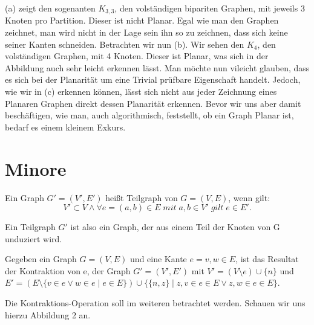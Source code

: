 \documentclass[runningheads]{llncs}
\begin{document}
(a) zeigt den sogenanten $K_{3,3}$, den
volständigen bipariten Graphen, mit jeweils 3 Knoten pro Partition. Dieser ist nicht Planar. Egal wie man den Graphen
zeichnet, man wird nicht in der Lage sein ihn so zu zeichnen, dass sich keine seiner Kanten schneiden. Betrachten wir
nun (b). Wir sehen den $K_4$, den volständigen Graphen, mit 4 Knoten. Dieser ist Planar, was sich in der Abbildung auch
sehr leicht erkennen lässt. Man möchte nun vileicht glauben, dass es sich bei der Planarität um eine Trivial prüfbare
Eigenschaft handelt. Jedoch, wie wir in (c) erkennen können, lässt sich nicht aus jeder Zeichnung eines Planaren Graphen
direkt dessen Planarität erkennen. Bevor wir uns aber damit beschäftigen, wie man, auch algorithmisch, feststellt, ob ein
Graph Planar ist, bedarf es einem kleinem Exkurs. 


\section{Minore}
\begin{definition}[Teilgraph]
    Ein Graph $G' = (V', E') $ heißt Teilgraph von $G = (V, E)$, wenn gilt:
    \[V' \subset V \land \forall e =(a, b) \in E \;mit\;  a,b \in V' \; gilt \; e \in E'.\]
\end{definition}
Ein Teilgraph $G'$ ist also ein Graph, der aus einem Teil der Knoten von G unduziert wird. 
\begin{definition}[Kantenkontraktion]
    Gegeben ein Graph $G = (V,E)$ und eine Kante $ e = {v, w} \in E $, ist das Resultat der Kontraktion von e, der Graph $G' = (V', E')$ mit
    $V' = (V \setminus e) \cup \{n \}$ und $E' = (E \setminus \{v \in e \lor w \in e  \mid e \in E \}) \cup \{ \{n, z\} \mid z,v \in e \in E \lor z,w \in e \in E\}$.
\end{definition}
Die Kontraktions-Operation soll im weiteren betrachtet werden. Schauen wir uns hierzu Abbildung 2 an.
\end{document}
